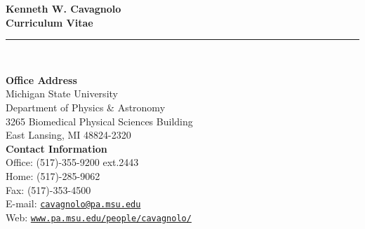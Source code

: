 \documentclass[11pt]{cv}
\begin{document}
\begin{center}
{\huge \textbf{\sc Kenneth W. Cavagnolo\\ \large Curriculum Vitae}}\\
\rule{17.35cm}{1pt}\\
\end{center}
\normalsize

\addresses
{
{\bf Office Address}\\
Michigan State University\\
Department of Physics \& Astronomy\\
3265 Biomedical Physical Sciences Building\\
East Lansing, MI 48824-2320\\
}
{
{\bf Contact Information}\\
Office: (517)-355-9200 ext.2443\\
Home: (517)-285-9062\\
Fax: (517)-353-4500\\
E-mail: \href{mailto:cavagnolo@pa.msu.edu}{\tt cavagnolo@pa.msu.edu}\\
Web: \href{http://www.pa.msu.edu/people/cavagnolo/}{\tt www.pa.msu.edu/people/cavagnolo/}\\
}
\end{document}
